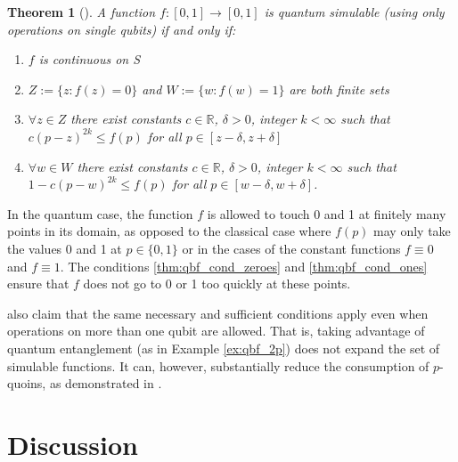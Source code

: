 \documentclass{article}
\newtheorem{thm}{Theorem}
\theoremstyle{definition}
\begin{document}
\begin{thm}[{\citet[Theorem 1]{dale2015}}]\label{thm:qbf_simulable}
A function $f:[0,1]\to[0,1]$ %
is quantum simulable (using only operations on single qubits) if and only if:
\begin{enumerate}[label=(\alph*)]
\item $f$ is continuous on S
\item $Z:=\{z:f(z)=0\}$ and $W:=\{w:f(w)=1\}$ are both finite sets
\item\label{thm:qbf_cond_zeroes} $\forall z\in Z$ there exist constants $c\in\mathbb{R}$, $\delta>0$, integer $k<\infty$ such that $c(p-z)^{2k} \leq f(p)$ for all $p \in [z-\delta, z+\delta]$
\item\label{thm:qbf_cond_ones} $\forall w\in W$ there exist constants $c\in\mathbb{R}$, $\delta>0$, integer $k<\infty$ such that $1 - c(p-w)^{2k} \leq f(p)$ for all $p \in [w-\delta, w+\delta]$.
\end{enumerate}
\end{thm}
In the quantum case, the function $f$ is allowed to touch 0 and 1 at finitely many points in its domain, as opposed to the classical case where $f(p)$ may only take the values 0 and 1 at $p\in\{0,1\}$ or in the cases of the constant functions $f\equiv 0$ and $f\equiv 1$.
The conditions \ref{thm:qbf_cond_zeroes} and \ref{thm:qbf_cond_ones} ensure that $f$ does not go to 0 or 1 too quickly at these points.

\citet{dale2015} also claim that the same necessary and sufficient conditions apply even when operations on more than one qubit are allowed. That is, taking advantage of quantum entanglement (as in Example \ref{ex:qbf_2p}) does not expand the set of simulable functions. It can, however, substantially reduce the consumption of $p$-quoins, as demonstrated in \citet{patel2018}.

\section{Discussion}
% 


\end{document}
